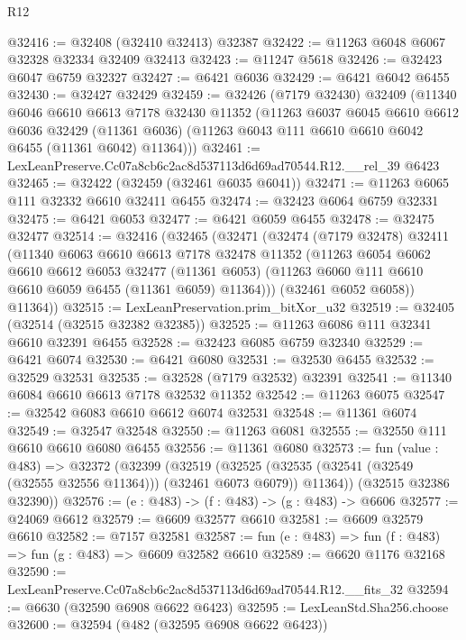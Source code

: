 \begin{lexlean}{R12}
\begin{coremodule}
@32416 := @32408 (@32410 @32413) @32387
@32422 := @11263 @6048 @6067 @32328 @32334 @32409 @32413
@32423 := @11247 @5618
@32426 := @32423 @6047 @6759 @32327
@32427 := @6421 @6036
@32429 := @6421 @6042 @6455
@32430 := @32427 @32429
@32459 := @32426
    (@7179 @32430)
    @32409
    (@11340
      @6046
      @6610
      @6613
      @7178
      @32430
      @11352
      (@11263
        @6037
        @6045
        @6610
        @6612
        @6036
        @32429
        (@11361 @6036)
        (@11263 @6043 @111 @6610 @6610 @6042 @6455 (@11361 @6042) @11364)))
@32461 := LexLeanPreserve.Cc07a8cb6c2ac8d537113d6d69ad70544.R12.__rel_39 @6423
@32465 := @32422 (@32459 (@32461 @6035 @6041))
@32471 := @11263 @6065 @111 @32332 @6610 @32411 @6455
@32474 := @32423 @6064 @6759 @32331
@32475 := @6421 @6053
@32477 := @6421 @6059 @6455
@32478 := @32475 @32477
@32514 := @32416
    (@32465
      (@32471
        (@32474
          (@7179 @32478)
          @32411
          (@11340
            @6063
            @6610
            @6613
            @7178
            @32478
            @11352
            (@11263
              @6054
              @6062
              @6610
              @6612
              @6053
              @32477
              (@11361 @6053)
              (@11263 @6060 @111 @6610 @6610 @6059 @6455 (@11361 @6059) @11364)))
          (@32461 @6052 @6058))
        @11364))
@32515 := LexLeanPreservation.prim_bitXor_u32
@32519 := @32405 (@32514 (@32515 @32382 @32385))
@32525 := @11263 @6086 @111 @32341 @6610 @32391 @6455
@32528 := @32423 @6085 @6759 @32340
@32529 := @6421 @6074
@32530 := @6421 @6080
@32531 := @32530 @6455
@32532 := @32529 @32531
@32535 := @32528 (@7179 @32532) @32391
@32541 := @11340 @6084 @6610 @6613 @7178 @32532 @11352
@32542 := @11263 @6075
@32547 := @32542 @6083 @6610 @6612 @6074 @32531
@32548 := @11361 @6074
@32549 := @32547 @32548
@32550 := @11263 @6081
@32555 := @32550 @111 @6610 @6610 @6080 @6455
@32556 := @11361 @6080
@32573 := fun (value : @483) =>
  @32372
    (@32399
      (@32519
        (@32525 (@32535 (@32541 (@32549 (@32555 @32556 @11364))) (@32461 @6073 @6079)) @11364))
      (@32515 @32386 @32390))
@32576 := (e : @483) -> (f : @483) -> (g : @483) -> @6606
@32577 := @24069 @6612
@32579 := @6609 @32577 @6610
@32581 := @6609 @32579 @6610
@32582 := @7157 @32581
@32587 := fun (e : @483) => fun (f : @483) => fun (g : @483) => @6609 @32582 @6610
@32589 := @6620 @1176 @32168
@32590 := LexLeanPreserve.Cc07a8cb6c2ac8d537113d6d69ad70544.R12.__fits_32
@32594 := @6630 (@32590 @6908 @6622 @6423)
@32595 := LexLeanStd.Sha256.choose
@32600 := @32594 (@482 (@32595 @6908 @6622 @6423))

\end{coremodule}
\end{lexlean}

